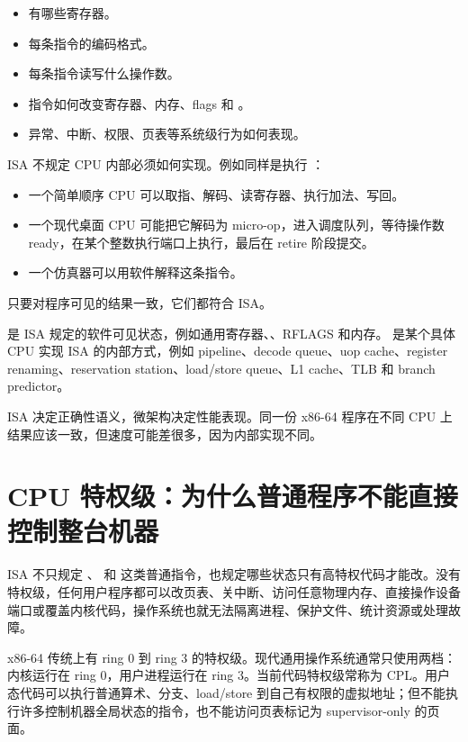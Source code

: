 \begin{itemize}
  \item 有哪些寄存器。
  \item 每条指令的编码格式。
  \item 每条指令读写什么操作数。
  \item 指令如何改变寄存器、内存、flags 和 。
  \item 异常、中断、权限、页表等系统级行为如何表现。
\end{itemize}

ISA 不规定 CPU 内部必须如何实现。例如同样是执行 ：

\begin{itemize}
  \item 一个简单顺序 CPU 可以取指、解码、读寄存器、执行加法、写回。
  \item 一个现代桌面 CPU 可能把它解码为 micro-op，进入调度队列，等待操作数 ready，在某个整数执行端口上执行，最后在 retire 阶段提交。
  \item 一个仿真器可以用软件解释这条指令。
\end{itemize}

只要对程序可见的结果一致，它们都符合 ISA。

 是 ISA 规定的软件可见状态，例如通用寄存器、、RFLAGS 和内存。  是某个具体 CPU 实现 ISA 的内部方式，例如 pipeline、decode queue、uop cache、register renaming、reservation station、load/store queue、L1 cache、TLB 和 branch predictor。

\begin{keyidea}
ISA 决定正确性语义，微架构决定性能表现。同一份 x86-64 程序在不同 CPU 上结果应该一致，但速度可能差很多，因为内部实现不同。
\end{keyidea}

\section{CPU 特权级：为什么普通程序不能直接控制整台机器}

ISA 不只规定 、 和  这类普通指令，也规定哪些状态只有高特权代码才能改。没有特权级，任何用户程序都可以改页表、关中断、访问任意物理内存、直接操作设备端口或覆盖内核代码，操作系统也就无法隔离进程、保护文件、统计资源或处理故障。

x86-64 传统上有 ring 0 到 ring 3 的特权级。现代通用操作系统通常只使用两档：内核运行在 ring 0，用户进程运行在 ring 3。当前代码特权级常称为 CPL。用户态代码可以执行普通算术、分支、load/store 到自己有权限的虚拟地址；但不能执行许多控制机器全局状态的指令，也不能访问页表标记为 supervisor-only 的页面。

